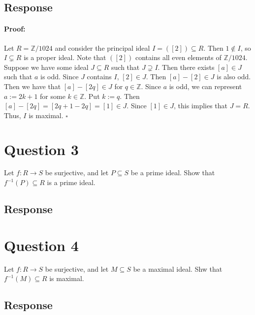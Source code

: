 \documentclass [12pt] {article}
\newcommand{\Z}{\mathbb{Z}}
\newenvironment{proof}{\paragraph{Proof:}}{\hfill$\square$}
\begin{document}
\subsection*{Response}
\begin{proof}
    Let $R = \Z/1024$ and consider the principal ideal $I = ([2]) \subseteq R$. Then $1 \not \in I$,
    so $I \subsetneq R$ is a proper ideal. Note that $([2])$ contains all even elements of
    $\Z/1024$. Suppose we have some ideal $J \subseteq R$ such that $J \supsetneq I$. Then there
    exists $[a] \in J$ such that $a$ is odd. Since $J$ contains $I$, $[2] \in J$. 
    Then $[a] - [2] \in J$ is also odd. Then we have that $[a] - [2q] \in J$ for 
    $q \in \Z$. Since $a$ is odd, we can represent $a := 2k + 1$ for some $k \in \Z$. 
    Put $k := q$. Then $[a] - [2q] = [2q + 1 - 2q] = [1] \in J$. Since 
    $[1] \in J$, this implies that $J = R$. Thus, $I$ is maximal.
\end{proof}

\newpage
\section*{Question 3}
Let $f:R\to S$ be surjective, and let $P\subseteq S$ be a prime ideal. Show that $f^{-1}(P)\subseteq R$ is a prime ideal. 
\subsection*{Response}

\newpage
\section*{Question 4}
Let $f:R\to S$ be surjective, and let $M\subseteq S$ be a maximal ideal. Shw that $f^{-1}(M)\subseteq R$ is maximal. 
\subsection*{Response}

\newpage
\end{document}
